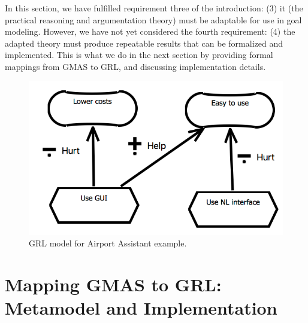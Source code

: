 \documentclass[11.5pt,two column]{llncs}
\begin{document}
In this section, we have fulfilled requirement three of the introduction: (3) it (the practical reasoning and argumentation theory) must be adaptable for use in goal modeling. However, we have not yet considered the fourth requirement: (4) the adapted theory must produce repeatable results that can be formalized and implemented. This is what we do in the next section by providing formal mappings from GMAS to GRL, and discussing implementation details.

\begin{figure}
\centering
\includegraphics[scale=0.35]{img/grl_example_airport}
\caption{GRL model for Airport Assistant example.}
\label{fig:example:airport:grl}
\end{figure}

\section{Mapping GMAS to GRL: Metamodel and Implementation}
\label{sect:implementation}
\end{document}
